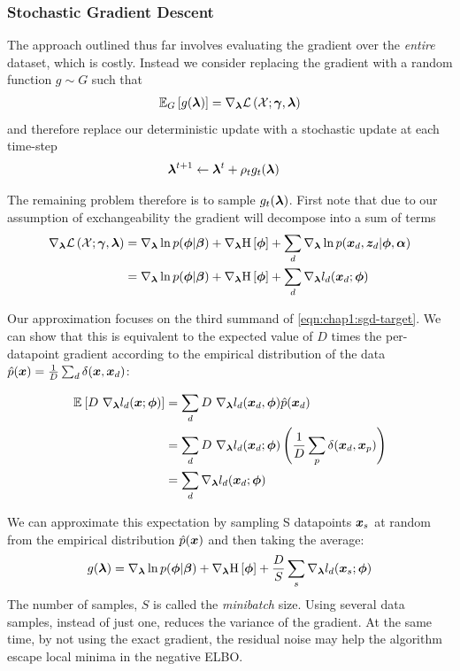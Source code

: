 \subsubsection*{Stochastic Gradient Descent}
The approach outlined thus far involves evaluating the gradient over the \emph{entire} dataset, which is costly. Instead we consider replacing the gradient with a random function $g \sim G$ such that 
\begin{align}
\ex{g(\varparam)}{G} = \nabla_\varparam \elbo
\end{align}
and therefore replace our deterministic update with a stochastic update at each time-step
\begin{align}
\varparam^{t+1} & \leftarrow \varparam^t + \rho_t g_t(\varparam)
\end{align}

The remaining problem therefore is to sample $g_t(\varparam)$. First note that due to our assumption of exchangeability the gradient will decompose into a sum of terms
\begin{align}
\nabla_\varparam \elbo
& = \nabla_\varparam \ln p(\param | \vv{\beta}) + \nabla_\varparam \ent{\param} + \sum_d \nabla_\varparam \ln p(\xd, \zd | \param, \vv{\alpha}) \\
& = \nabla_\varparam \ln p(\param | \vv{\beta}) + \nabla_\varparam \ent{\param} + \sum_d \nabla_\varparam l_d(\xd; \param) \label{eqn:chap1:sgd-target}
\end{align}

Our approximation focuses on the third summand of \eqref{eqn:chap1:sgd-target}. We can show that this is equivalent to the expected value of $D$ times the per-datapoint gradient according to the empirical distribution of the data $\hat{p}(\vv{x}) = \oneover{D}\sum_d \delta(\vv{x}, \xd)$: 

\begin{align}
\ex{D \text{ } \nabla_\varparam l_d(\vv{x}; \param)}{}
& = \sum_d D \text{ } \nabla_\varparam l_d(\xd, \param) \hat{p}(\xd) \\
& = \sum_d D \text{ } \nabla_\varparam l_d(\xd; \param) \left(\frac{1}{D} \sum_p \delta(\xd, \vv{x}_p)\right) \\ 
& = \sum_d \nabla_\varparam l_d(\xd; \param)
\end{align}

We can approximate this expectation by sampling S datapoints $\vv{x}_s$ at random from the empirical distribution $\hat{p}(\vv{x})$ and then taking the average:
\begin{align}
g(\varparam) = \nabla_\varparam \ln p(\param | \vv{\beta}) + \nabla_\varparam \ent{\param} + \frac{D}{S} \sum_s \nabla_\varparam l_d(\vv{x}_s; \param)
\end{align}
The number of samples, $S$ is called the \emph{minibatch} size. Using several data samples, instead of just one, reduces the variance of the gradient. At the same time, by not using the exact gradient, the residual noise may help the algorithm escape local minima in the negative ELBO\cite{Bottou2004}.

